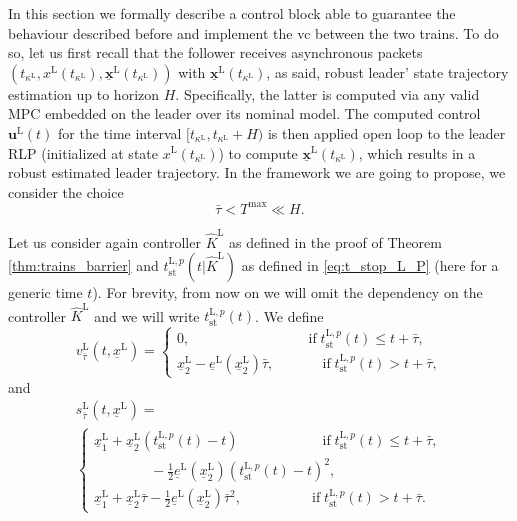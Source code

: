 \documentclass[letterpaper, 10 pt, conference]{ieeeconf}
\theoremstyle{definition}
\theoremstyle{nopoint}
\newcounter{Theorem}
\begin{document}
In this section we formally describe a control block able to guarantee the behaviour described before and implement the \gls{vc} between the two trains.  
To do so, let us first recall that the follower receives asynchronous packets $\left ( t_{\kappa^\mathrm{L}}, x^\mathrm{L}(t_{\kappa^\mathrm{L}}),\underline{\mathbf{x}}^\mathrm{L}(t_{\kappa^\mathrm{L}})\right)$ with $\underline{\mathbf{x}}^\mathrm{L}(t_{\kappa^\mathrm{L}})$, as said, robust leader' state trajectory estimation up to horizon $H$. Specifically, the latter is computed via any valid MPC embedded on the leader over its nominal model. The computed control $\mathbf{u}^\mathrm{L}(t)$ for the time interval  $[t_{\kappa^\mathrm{L}},t_{\kappa^\mathrm{L}}+H)$ is then applied open loop to the leader RLP (initialized at state $x^\mathrm{L}(t_{\kappa^\mathrm{L}})$) to compute $\underline{\mathbf{x}}^\mathrm{L}(t_{\kappa^\mathrm{L}})$, which results in a robust estimated leader trajectory. 
In the framework we are going to propose, we consider the choice
\begin{equation}\label{eq:tau_H_inequality}
\bar{\tau} < T^{\max}\ll H.
\end{equation}

Let us consider again controller $\hat{K}^\mathrm{L}$ as defined in the proof of Theorem \ref{thm:trains_barrier} and $t_{\mathrm{st}}^{\mathrm{L},p}(t |\hat{K}^\mathrm{L})$ as defined in \eqref{eq:t_stop_L_P} (here for a generic time $t$). For brevity, from now on we will omit the dependency on the controller $\hat{K}^\mathrm{L}$ and we will write $t_{\mathrm{st}}^{\mathrm{L},p}(t)$.
We define
\begin{equation}\label{eq:v_tau_L}
 	v_{\bar{\tau}}^\mathrm{L}\left( t,\underline{x}^\mathrm{L} \right)=
 	\begin{cases}
 		0, \qquad \qquad \qquad \quad  \quad \; \, \text{if} \;  t_{\mathrm{st}}^{\mathrm{L},p}(t) \leq t+\bar{\tau}, \\
 		\underline{x}_2^\mathrm{L}-\underline{e}^\mathrm{L}\left(\underline{x}_2^\mathrm{L}\right)\bar{\tau}, \qquad \quad \; \, \text{if} \; t_{\mathrm{st}}^{\mathrm{L},p}(t) > t+\bar{\tau},
 	\end{cases}
\end{equation}
and
 \begin{multline}\label{eq:s_tau_L}
 	s_{\bar{\tau}}^\mathrm{L}\left( t,\underline{x}^\mathrm{L} \right)=\\
 	\begin{cases}
 		\underline{x}_1^\mathrm{L}+ \underline{x}_2^\mathrm{L}\left( t_{\mathrm{st}}^{\mathrm{L},p}(t) -t \right) \qquad \qquad \qquad    \text{if} \; t_{\mathrm{st}}^{\mathrm{L},p}(t) \leq t+\bar{\tau}, \\ \qquad \qquad  -\frac{1}{2}\underline{e}^\mathrm{L}\left(\underline{x}_2^\mathrm{L} \right)\left(t_{\mathrm{st}}^{\mathrm{L},p}(t) -t \right)^2,  \\
 		\underline{x}_1^\mathrm{L}+ \underline{x}_2^\mathrm{L}\bar{\tau} - \frac{1}{2}\underline{e}^\mathrm{L}\left(\underline{x}_2^\mathrm{L} \right)\bar{\tau}^2, \quad \qquad \qquad \text{if}  \; t_{\mathrm{st}}^{\mathrm{L},p}(t) > t+\bar{\tau}.
 	\end{cases}
 \end{multline}
\end{document}
